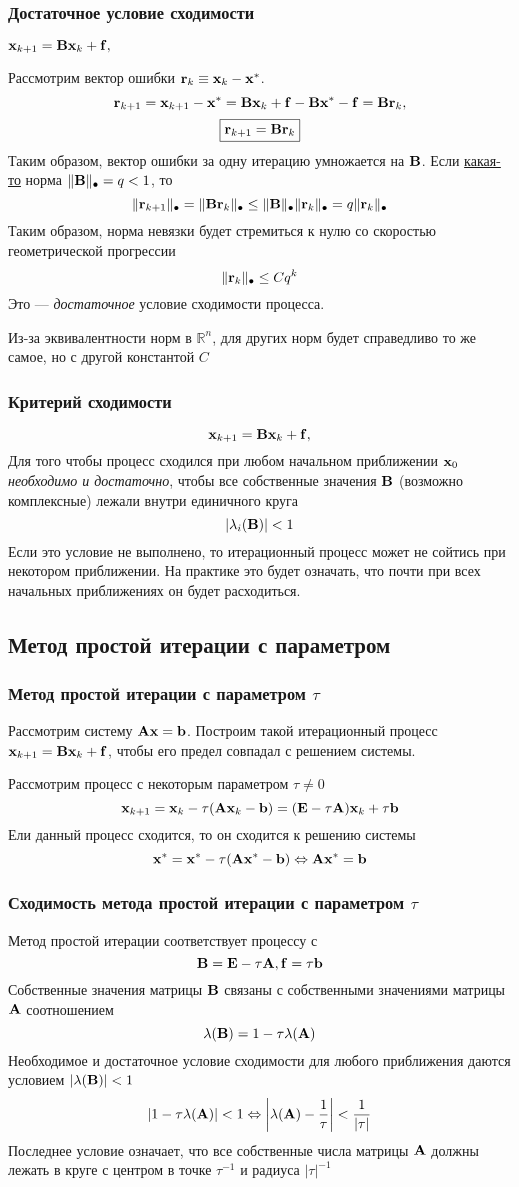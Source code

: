 \documentclass[apectratio=43,unicode]{beamer}
\begin{document}
\begin{frame}\frametitle{Достаточное условие сходимости}
	\centerline{$\mathbf{x}_{k+1} = \mathbf{B} \mathbf{x}_k + \mathbf{f},$}
	Рассмотрим вектор ошибки $\mathbf{r}_k \equiv \mathbf{x}_k - \mathbf{x}^*$.
	\[
	\mathbf{r}_{k+1} = \mathbf{x}_{k+1}-\mathbf{x}^* = \mathbf{B} \mathbf{x}_k + \mathbf{f}-\mathbf{B} \mathbf{x}^* - \mathbf{f} = \mathbf{B} \mathbf{r}_k,
	\]
	\[
		\fbox{$\mathbf{r}_{k+1} = \mathbf{B} \mathbf{r}_k$}
	\]
	Таким образом, вектор ошибки за одну итерацию умножается на $\mathbf{B}$. Если \underline{какая-то} норма
	$\|\mathbf{B}\|_\bullet = q < 1$, то
	\[
	\|\mathbf{r}_{k+1}\|_\bullet = \|\mathbf{B}\mathbf{r}_k\|_\bullet \leq \|\mathbf{B}\|_\bullet \|\mathbf{r}_k\|_\bullet = q \| \mathbf{r}_k \|_\bullet
	\]
	Таким образом, норма невязки будет стремиться к нулю со скоростью геометрической прогрессии
	\[
	\|\mathbf{r}_k\|_\bullet \leq C q^k
	\]
	Это --- \emph{достаточное} условие сходимости процесса.

	Из-за эквивалентности норм в $\mathbb{R}^n$, для других норм будет справедливо то же самое, но с другой константой $C$
\end{frame}

\begin{frame}\frametitle{Критерий сходимости}
	\[
	\mathbf{x}_{k+1} = \mathbf{B} \mathbf{x}_k + \mathbf{f},
	\]
	Для того чтобы процесс сходился при любом начальном приближении $\mathbf{x}_0$
	\emph{необходимо и достаточно},
	чтобы все собственные значения $\mathbf{B}$ (возможно комплексные) лежали внутри единичного круга
	\[
	|\lambda_i(\mathbf{B})| < 1
	\]
	Если это условие не выполнено, то итерационный процесс может не сойтись при
некотором приближении. На практике это будет означать, что почти при всех
начальных приближениях он будет расходиться.
\end{frame}

\subsection{Метод простой итерации с параметром}
\begin{frame}\frametitle{Метод простой итерации с параметром $\tau$}
	Рассмотрим систему $\mathbf{A}\mathbf{x} = \mathbf{b}$. Построим такой итерационный процесс $\mathbf{x}_{k+1} = \mathbf{B} \mathbf{x}_k + \mathbf{f}$, чтобы
	его предел совпадал с решением системы.

	\pause
	Рассмотрим процесс с некоторым параметром $\tau \neq 0$
	\[
	\mathbf{x}_{k+1} = \mathbf{x}_k - \tau(\mathbf{A}\mathbf{x}_k - \mathbf{b}) = (\mathbf{E} - \tau \mathbf{A}) \mathbf{x}_k + \tau \mathbf{b}
	\]
	Ели данный процесс сходится, то он сходится к решению системы
	\[
	\mathbf{x}^* = \mathbf{x}^* - \tau(\mathbf{A}\mathbf{x}^* - \mathbf{b}) \Leftrightarrow \mathbf{A} \mathbf{x}^* = \mathbf{b}
	\]
\end{frame}

\begin{frame}\frametitle{Сходимость метода простой итерации с параметром $\tau$}
	Метод простой итерации соответствует процессу с $$\mathbf{B} = \mathbf{E} - \tau \mathbf{A}, \mathbf{f} = \tau \mathbf{b}$$
	\pause
	Собственные значения матрицы $\mathbf{B}$ связаны с собственными значениями матрицы $\mathbf{A}$ соотношением
	$$
	\lambda(\mathbf{B}) = 1 - \tau \lambda(\mathbf{A})
	$$
	Необходимое и достаточное условие сходимости для любого приближения даются условием $|\lambda(\mathbf{B})| < 1$
	$$
	|1 - \tau \lambda(\mathbf{A})| < 1 \Leftrightarrow \left|\lambda(\mathbf{A}) -
\frac{1}{\tau}\right| < \frac{1}{|\tau|}
	$$
	Последнее условие означает, что все собственные числа матрицы $\mathbf{A}$ должны
лежать в круге с центром в точке $\tau^{-1}$ и радиуса $|\tau|^{-1}$
\end{frame}
\end{document}
